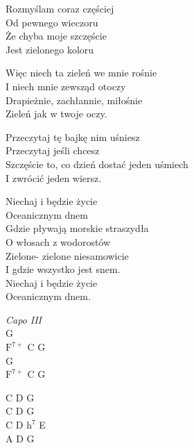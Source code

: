 \begin{text}
    \chordfill
    Rozmyślam coraz częściej\\
    Od pewnego wieczoru\\
    Że chyba moje szczęście\\
    Jest zielonego koloru

    Więc niech ta zieleń we mnie rośnie\\
    I niech mnie zewsząd otoczy\\
    Drapieżnie, zachłannie, miłośnie\\
    Zieleń jak w twoje oczy.

    Przeczytaj tę bajkę nim uśniesz\\
    Przeczytaj jeśli chcesz\\
    Szczęście to, co dzień dostać jeden uśmiech\\
    I zwrócić jeden wiersz.

    Niechaj i będzie życie\\
    Oceanicznym dnem\\
    Gdzie pływają morskie straszydła\\
    O włosach z wodorostów\\
    Zielone- zielone niesamowicie\\
    I gdzie wszystko jest snem.\\
    Niechaj i będzie życie\\
    Oceanicznym dnem.
\end{text}
\begin{chord}
    \textit{Capo III}\\
    G\\
    $\mathrm{F^{7+}}$ C G\\
    G\\
    $\mathrm{F^{7+}}$ C G

    C D	G\\
    C D	G\\
    C D	$\mathrm{h^{7}}$ E\\
    A D	G
\end{chord}
